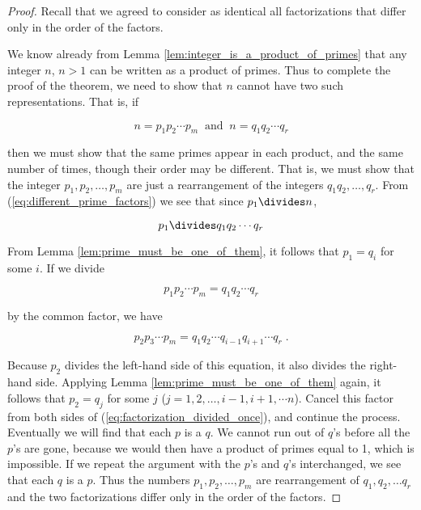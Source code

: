 \documentclass{article}
\theoremstyle{definition} %
\theoremstyle{definition}
\theoremstyle{definition}
\theoremstyle{definition}
\begin{document}
  \begin{proof}
    Recall that we agreed to consider as identical all factorizations that differ only in the order of the factors.
    
    We know already from Lemma \ref{lem:integer_is_a_product_of_primes} that any integer $n$, $n > 1$
    can be written as a product of primes. Thus to complete the proof of the theorem, we need to show
    that $n$ cannot have two such representations. That is, if
    
    \begin{equation}
      n = p_1p_2\cdots p_m \;\;\text{and}\;\; n = q_1q_2\cdots q_r
      \label{eq:different_prime_factors}
    \end{equation}
    
    then we must show that the same primes appear in each product, and the same number of times,
    though their order may be different. That is, we must show that the integer $p_1, p_2, \dots, p_m$
    are just a rearrangement of the integers $q_1q_2, \dots, q_r$. From (\ref{eq:different_prime_factors})
    we see that since $p_1 \divides n$,
    
    \begin{equation*}
      p_1 \divides q_1q_2\cdots q_r
    \end{equation*}
    
    From Lemma \ref{lem:prime_must_be_one_of_them}, it follows that $p_1 = q_i$ for some $i$.
    If we divide
    
    \begin{equation*}
      p_1p_2\cdots p_m = q_1q_2\cdots q_r
    \end{equation*}
    
    by the common factor, we have
    
    \begin{equation}
      p_2p_3\cdots p_m = q_1q_2\cdots q_{i-1}q_{i+1}\cdots q_r\;\text{.}
      \label{eq:factorization_divided_once}
    \end{equation}
    
    Because $p_2$ divides the left-hand side of this equation, it also divides the right-hand side.
    Applying Lemma \ref{lem:prime_must_be_one_of_them} again, it follows that $p_2 = q_j$
    for some $j$ ($j = 1, 2, \dots, i - 1, i + 1, \dotsm n$). Cancel this factor from both sides of
    (\ref{eq:factorization_divided_once}), and continue the process. Eventually we will find that
    each $p$ is a $q$. We cannot run out of $q$'s before all the $p$'s are gone, because we would
    then have a product of primes equal to 1, which is impossible. If we repeat the argument with
    the $p$'s and $q$'s interchanged, we see that each $q$ is a $p$. Thus the numbers $p_1,
    p_2, \dots, p_m$ are rearrangement of $q_1, q_2, \dots q_r$ and the two factorizations differ only in the
    order of the factors.
  \end{proof}
  
\end{document}

